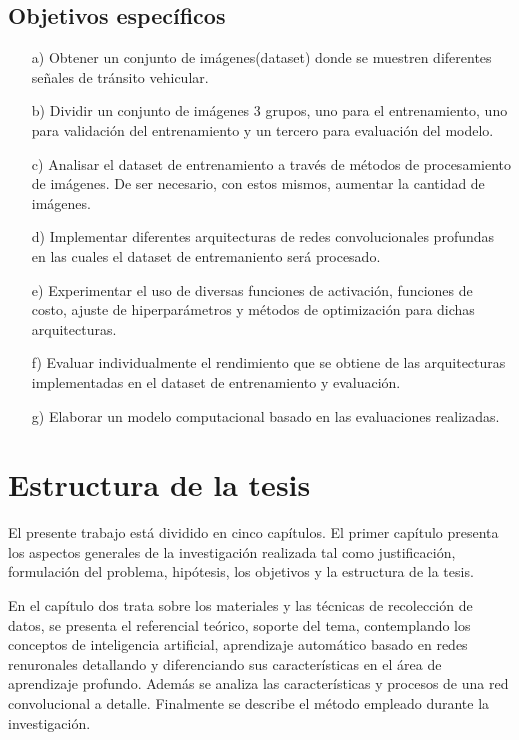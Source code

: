 	\subsection{Objetivos específicos}
	\begin{enumerate}
	
	\item[a)] Obtener un conjunto de imágenes(dataset) donde se muestren diferentes señales de tránsito vehicular.
	\item[b)] Dividir un conjunto de imágenes 3 grupos, uno para el entrenamiento, uno para validación del entrenamiento y un tercero para evaluación del modelo. 
	\item[c)] Analisar el dataset de entrenamiento a través de métodos de procesamiento de imágenes. De ser necesario, con estos mismos, aumentar la cantidad de imágenes.
	\item[d)] Implementar diferentes arquitecturas de redes convolucionales profundas en las cuales el dataset de entremaniento será procesado.
	\item[e)] Experimentar el uso de diversas funciones de activación, funciones de costo, ajuste de hiperparámetros y métodos de optimización para dichas arquitecturas. 
	\item[f)] Evaluar individualmente el rendimiento que se obtiene de las arquitecturas implementadas en el dataset de entrenamiento y evaluación.
	\item[g)] Elaborar un modelo computacional basado en las evaluaciones realizadas.
	\end{enumerate}



\section{Estructura de la tesis}

	\vskip 0.1cm
	El presente trabajo está dividido en cinco capítulos. El primer capítulo presenta los aspectos generales de la investigación realizada tal como justificación, formulación del problema, hipótesis, los objetivos y la estructura de la tesis.

	En el capítulo dos trata sobre los materiales y las técnicas de recolección de datos, se presenta el referencial teórico, soporte del tema, contemplando los conceptos de inteligencia artificial, aprendizaje automático basado en redes renuronales detallando y diferenciando sus características en el área de aprendizaje profundo. Además se analiza las características y procesos de una red convolucional a detalle. Finalmente se describe el método empleado durante la investigación.

